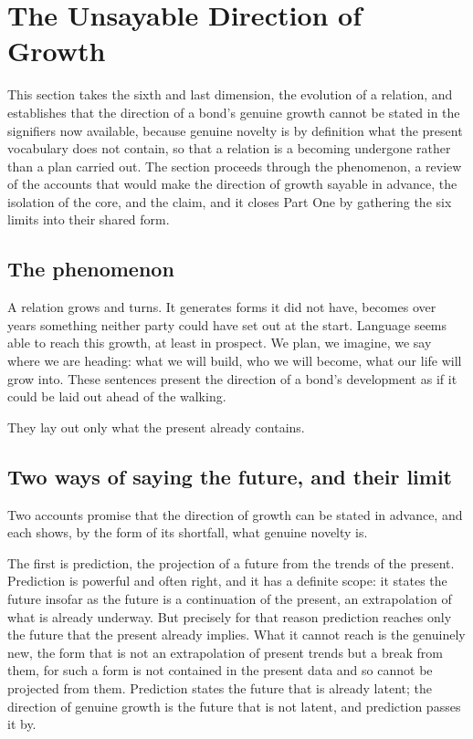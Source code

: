 \section{The Unsayable Direction of Growth}
\label{p26:sec:evolution}

\noindent
This section takes the sixth and last dimension, the evolution of a relation, and establishes that the direction of a bond's genuine growth cannot be stated in the signifiers now available, because genuine novelty is by definition what the present vocabulary does not contain, so that a relation is a becoming undergone rather than a plan carried out. The section proceeds through the phenomenon, a review of the accounts that would make the direction of growth sayable in advance, the isolation of the core, and the claim, and it closes Part One by gathering the six limits into their shared form.

\subsection*{The phenomenon}

A relation grows and turns. It generates forms it did not have, becomes over years something neither party could have set out at the start. Language seems able to reach this growth, at least in prospect. We plan, we imagine, we say where we are heading: what we will build, who we will become, what our life will grow into. These sentences present the direction of a bond's development as if it could be laid out ahead of the walking.

They lay out only what the present already contains.

\subsection*{Two ways of saying the future, and their limit}

Two accounts promise that the direction of growth can be stated in advance, and each shows, by the form of its shortfall, what genuine novelty is.

The first is prediction, the projection of a future from the trends of the present. Prediction is powerful and often right, and it has a definite scope: it states the future insofar as the future is a continuation of the present, an extrapolation of what is already underway. But precisely for that reason prediction reaches only the future that the present already implies. What it cannot reach is the genuinely new, the form that is not an extrapolation of present trends but a break from them, for such a form is not contained in the present data and so cannot be projected from them. Prediction states the future that is already latent; the direction of genuine growth is the future that is not latent, and prediction passes it by.

